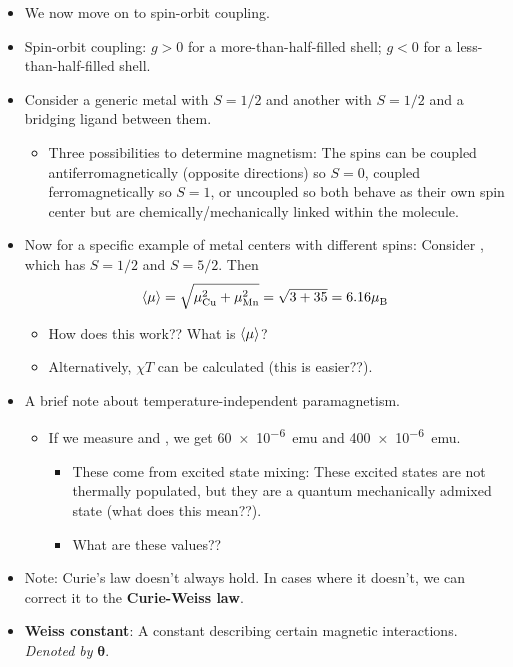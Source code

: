\documentclass[../notes.tex]{subfiles}
\begin{document}
\begin{itemize}
    \item We now move on to spin-orbit coupling.
    \item Spin-orbit coupling: $g>0$ for a more-than-half-filled shell; $g<0$ for a less-than-half-filled shell.
    \item Consider a generic metal  with $S=1/2$ and another with $S=1/2$ and a bridging ligand  between them.
    \begin{itemize}
        \item Three possibilities to determine magnetism: The spins can be coupled antiferromagnetically (opposite directions) so $S=0$, coupled ferromagnetically so $S=1$, or uncoupled so both behave as their own spin center but are chemically/mechanically linked within the molecule.
    \end{itemize}
    \item Now for a specific example of metal centers with different spins: Consider , which has $S=1/2$ and $S=5/2$. Then
    \begin{equation*}
        \prb{\mu} = \sqrt{\mu_{\ce{Cu}}^2+\mu_{\ce{Mn}}^2}
        = \sqrt{3+35}
        = 6.16\mB
    \end{equation*}
    \begin{itemize}
        \item How does this work?? What is $\left\langle{\mu}\right\rangle$?
        \item Alternatively, $\chi T$ can be calculated (this is easier??).
    \end{itemize}
    \item A brief note about temperature-independent paramagnetism.
    \begin{itemize}
        \item If we measure  and , we get \SI{60e-6}{emu} and \SI{400e-6}{emu}.
        \begin{itemize}
            \item These come from excited state mixing: These excited states are not thermally populated, but they are a quantum mechanically admixed state (what does this mean??).
            \item What are these values??
        \end{itemize}
    \end{itemize}
    \item Note: Curie's law doesn't always hold. In cases where it doesn't, we can correct it to the \textbf{Curie-Weiss law}.
    \item \textbf{Weiss constant}: A constant describing certain magnetic interactions. \emph{Denoted by} $\bm{\theta}$.

\end{itemize}
\end{document}
